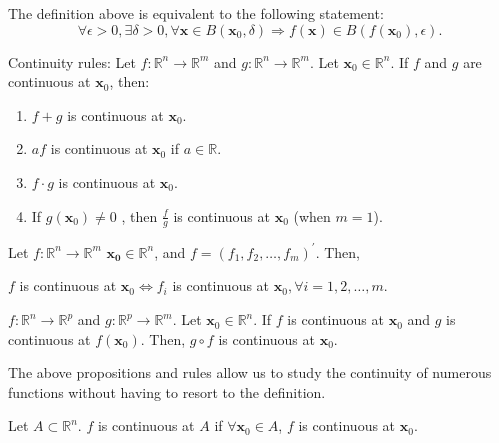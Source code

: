 \begin{remark*}
    The definition above is equivalent to the following statement:
    \[
        \forall \epsilon > 0, \exists \delta > 0, \forall\mathbf{x} \in B(\mathbf{x}_0, \delta) \Longrightarrow f(\mathbf{x}) \in B(f(\mathbf{x}_0),\epsilon).
    \]
\end{remark*}

Continuity rules: Let \(f: \mathbb{R}^{n} \rightarrow \mathbb{R}^{m}\) and
\(g: \mathbb{R}^{n} \rightarrow \mathbb{R}^{m}\). Let
\(\mathbf{x}_{0} \in \mathbb{R}^{n}\). If \(f\) and \(g\) are
continuous at \(\mathbf{x}_{0}\), then:
\begin{enumerate}
    \item
          \(f + g\) is continuous at \(\mathbf{x}_{0}\).
    \item
          \(a f\) is continuous at \(\mathbf{x}_{0}\) if \(a \in \mathbb{R}\).
    \item
          \(f \cdot g\) is continuous at \(\mathbf{x}_{0}\).
    \item
          If \(g(\mathbf{x}_{0}) \neq 0\) , then \(\frac{f}{g}\) is continuous at \(\mathbf{x}_{0}\) (when \(m = 1\)).
\end{enumerate}


\begin{proposition}
    Let \(f:\mathbb{R}^{n}\rightarrow \mathbb{R}^{m}\) \(\mathbf{x_{0}}\in \mathbb{R}^{n}\), and \(f = (f_{1},f_{2},\ldots ,f_{m})^{\prime}\). Then,

    \(f\) is continuous at \(\mathbf{x}_{0}\iff f_{i}\) is continuous at \(\mathbf{x}_{0},\forall i = 1,2,\ldots ,m.\)
\end{proposition}


\begin{proposition}
    \(f:\mathbb{R}^{n}\rightarrow \mathbb{R}^{p}\) and \(g:\mathbb{R}^{p}\rightarrow \mathbb{R}^{m}\). Let \(\mathbf{x}_0\in \mathbb{R}^n\). If \(f\) is continuous at \(\mathbf{x}_0\) and \(g\) is continuous at \(f(\mathbf{x}_0)\). Then, \(g\circ f\) is continuous at \(\mathbf{x}_0\).
\end{proposition}

\begin{remark*}
    The above propositions and rules allow us to study the continuity of numerous functions without having to resort to the definition.
\end{remark*}


\begin{definition}
    Let \(A\subset \mathbb{R}^{n}\). \(f\) is continuous at \(A\) if \(\forall \mathbf{x}_0\in A\), \(f\) is continuous at \(\mathbf{x}_0\).
\end{definition}

